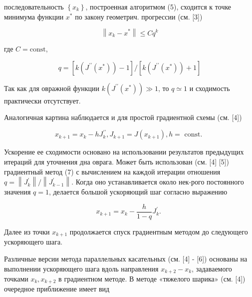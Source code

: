 \documentclass[10pt]{article}
\begin{document}
последовательность $\left\{x_{k}\right\}$, построенная алгоритмом (5), сходится к точке минимума функции $x^{*}$ по закону геометрич. прогрессии (см. [3])



\[

\left\|x_{k}-x^{*}\right\| \leqslant C q^{k}

\]



где $C=\mathrm{const}$,



\[

q=\left[k\left(J^{\prime \prime}\left(x^{*}\right)\right)-1\right] /\left[k\left(J^{\prime \prime}\left(x^{*}\right)\right)+1\right]

\]



Так как для овражной функции $k\left(J^{\prime \prime}\left(x^{*}\right)\right) \gg 1$, то $q \simeq 1$ и сходимость практически отсутствует.



Аналогичная картина наблюдается и для простой градиентной схемы (см. [4])



\[

x_{k+1}=x_{k}-h J_{k}^{\prime \prime}, J_{k+1}=J\left(x_{k+1}\right), h=\text { const. }

\]



Ускорение ее сходимости основано на использовании результатов предыдущих итераций для уточнения дна оврага. Может быть использован (см. [4] [5]) градиентный метод (7) с вычислением на каждой итерации отношения $q=\left\|J_{k}^{\prime}\right\| /\left\|J_{k-1}^{\prime}\right\|$. Когда оно устанавливается около нек-рого постоянного значения $q=1$, делается большой ускоряющий шаг согласно выражению



\[

x_{k+1}=x_{k}-\frac{h}{1-q} J_{k}^{\prime} \text {. }

\]



Далее из точки $x_{k+1}$ продолжается спуск градиентным методом до следующего ускоряющего шага.



Различные версии метода параллельных касательных (см. [4] - [6]) основаны на выполнении ускоряющего шага вдоль направления $x_{k+2}-x_{k}$, задаваемого точками $x_{k}, x_{k+2}$ в градиентном методе. В методе «тяжелого шарика» (см. [4]) очередное приближение имеет вид
\end{document}
